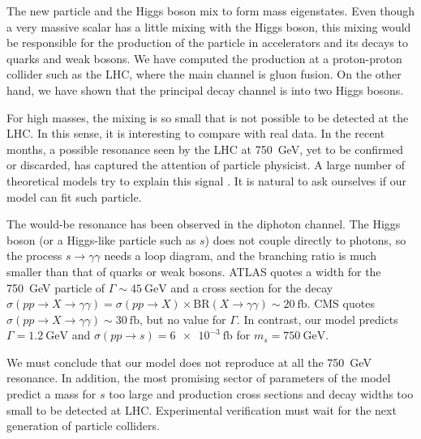 \documentclass[aps,prd,preprintnumbers,nofootinbibn,twocolumn]{revtex4}
\begin{document}
The new particle and the Higgs boson mix to form mass eigenstates. Even though a very massive scalar has a little mixing with the Higgs boson, this mixing would be responsible for the production of the particle in accelerators and its decays to quarks and weak bosons. We have computed the production at a proton-proton collider such as the LHC, where the main channel is gluon fusion. On the other hand, we have shown that the principal decay channel is into two Higgs bosons.

For high masses, the mixing is so small that is not possible to be detected at the LHC. In this sense, it is interesting to compare with real data. In the recent months, a possible resonance seen by the LHC at \SI{750}{\giga\electronvolt}\cite{ATLAS:2015, CMS:2015dxe, Aaboud:2016tru}, yet to be confirmed or discarded, has captured the attention of particle physicist. A large number of theoretical models try to explain this signal \cite{Staub:2016dxq}. It is natural to ask ourselves if our model can fit such particle.

The would-be resonance has been observed in the diphoton channel. The Higgs boson (or a Higgs-like particle such as $s$) does not couple directly to photons, so the process $s \to \gamma\gamma$ needs a loop diagram, and the branching ratio is much smaller than that of quarks or weak bosons. ATLAS quotes a width for the \SI{750}{\giga\electronvolt} particle of $\Gamma \sim \SI{45}{\giga\electronvolt}$ and a cross section for the decay $\sigma(pp \to X \to \gamma\gamma) = \sigma(pp\to X)\times \mathrm{BR}(X \to \gamma\gamma) \sim \SI{20}{\femto\barn}$. CMS quotes
$\sigma(pp \to X \to \gamma\gamma) \sim \SI{30}{\femto\barn}$, but no value for $\Gamma$. In contrast, our model predicts $\Gamma = \SI{1.2}{\giga\electronvolt}$ and $\sigma(pp\to s)= \SI{6e-3}{\femto\barn}$ for $m_s = \SI{750}{\giga\electronvolt}$.

We must conclude that our model does not reproduce at all the \SI{750}{\giga\electronvolt} resonance. In addition, the most promising sector of parameters of the model predict a mass for $s$ too large and production cross sections and decay widths too small to be detected at LHC. Experimental verification must wait for the next generation of particle colliders.


\end{document}
